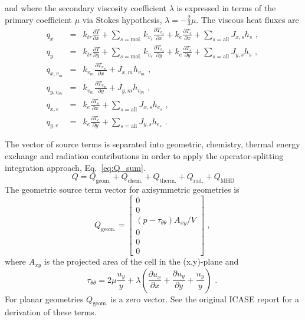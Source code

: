 and where the secondary viscosity coefficient $\lambda$ is expressed 
in terms of the primary coefficient $\mu$ via Stokes hypothesis, $\lambda = - \frac{2}{3} \mu$. 
The viscous heat fluxes are
\begin{eqnarray}
 q_{x} &=& k_{tr} \frac{\partial T}{\partial x} + \sum_{s=\text{mol.}} k_{v_{s}} \frac{\partial T_{v_{s}}}{\partial x} + k_{e} \frac{\partial T_{e}}{\partial x} + \sum_{s=\text{all}}{ J_{x,s} h_{s} } \text{ , } \nonumber \\
 q_{y} &=& k_{tr} \frac{\partial T}{\partial y} + \sum_{s=\text{mol.}} k_{v_{s}} \frac{\partial T_{v_{s}}}{\partial y} + k_{e} \frac{\partial T_{e}}{\partial y} + \sum_{s=\text{all}}{ J_{y,s} h_{s} } \text{ , } \nonumber \\
 q_{x,v_{m}} &=& k_{v_{m}} \frac{\partial T_{v_{m}}}{\partial x} + J_{x,m} h_{v_{m}} \text{ , } \nonumber \\
 q_{y,v_{m}} &=& k_{v_{m}} \frac{\partial T_{v_{m}}}{\partial y} + J_{y,m} h_{v_{m}} \text{ , } \nonumber \\
 q_{x,e} &=& k_{e} \frac{\partial T_{e}}{\partial x} + \sum_{s=\text{all}}{ J_{x,s} h_{e_{s}} } \text{ , } \nonumber \\
 q_{y,e} &=& k_{e} \frac{\partial T_{e}}{\partial y} + \sum_{s=\text{all}}{ J_{y,s} h_{e_{s}} } \text{ . } \label {eq:qs}
\end{eqnarray}

\medskip
The vector of source terms is separated into geometric, chemistry, thermal energy exchange and radiation contributions 
in order to apply the operator-splitting integration approach, Eq.~\ref{eq:Q_sum}.
\begin{equation}
 Q = Q_{\text{geom.}} + Q_{\text{chem.}} + Q_{\text{therm.}} + Q_{\text{rad.}} + Q_{\text{MHD}}
 \label{eq:Q_sum}
\end{equation}
The geometric source term vector for axisymmetric geometries is
\begin{equation}
 Q_{\text{geom.}} = \left [ \begin{array}{c} 0 \\ 0 \\ \left ( p - \tau_{\theta \theta} \right ) A_{xy} / V \\ 0 \\ 0 \\ 0 \end{array} \right ] \text{ , }
 \label{eq:Q_geom}
\end{equation}
where $A_{xy}$ is the projected area of the cell in the (x,y)-plane and 
\begin{equation}
 \tau_{\theta\theta} = 2 \mu \frac{u_{y}}{y} + \lambda \left ( \frac{\partial u_{x} }{\partial x} + \frac{\partial u_{y} }{\partial y} + \frac{u_{y}}{y} \right ) \text{ . }
 \label{eq:tau00}
\end{equation}
For planar geometries $Q_{\text{geom.}}$ is a zero vector.
See the original ICASE report \cite{jacobs_91d} for a derivation of these terms.

